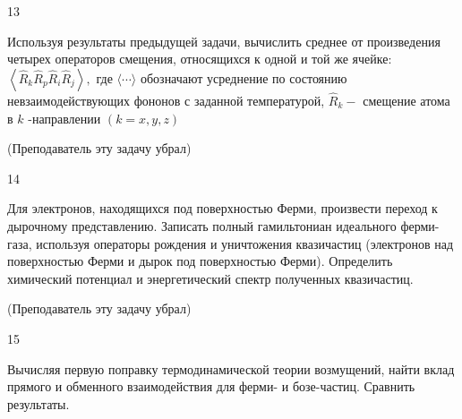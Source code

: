 \documentclass[a4paper,12pt]{article} %
\begin{document}
\begin{task}

13

Используя результаты предыдущей задачи, вычислить среднее от произведения четырех операторов смещения, относящихся к одной и той же ячейке: $\left\langle\hat{R}_{k} \hat{R}_{p} \hat{R}_{i} \hat{R}_{j}\right\rangle,$ где $\langle\cdots\rangle$ обозначают усреднение по состоянию невзаимодействующих фононов с заданной температурой, $\hat{R}_{k}-$ смещение атома в $k$ -направлении $(k=x, y, z)$

(Преподаватель эту задачу убрал)














\end{task}


\begin{task}

14

Для электронов, находящихся под поверхностью Ферми, произвести переход к дырочному представлению. 
Записать полный гамильтониан идеального ферми-газа, используя операторы рождения и уничтожения квазичастиц 
(электронов над поверхностью Ферми и дырок под поверхностью Ферми). 
Определить химический потенциал и энергетический спектр полученных квазичастиц. 



(Преподаватель эту задачу убрал)










\end{task}


\begin{task}

15

Вычисляя первую поправку термодинамической теории возмущений, 
найти вклад прямого и обменного взаимодействия для ферми- и бозе-частиц. 
Сравнить результаты.














\end{task}
\end{document}
